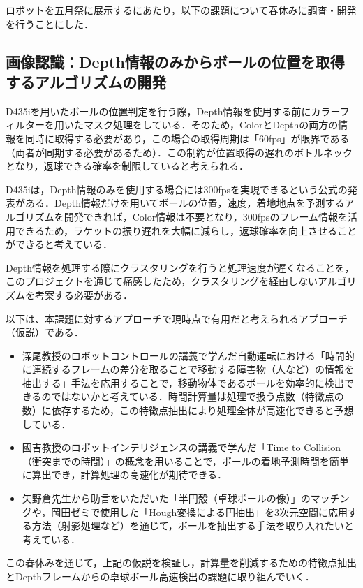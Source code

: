 \documentclass[10pt, oneside, titlepage]{ltjarticle}  %
\begin{document}
  ロボットを五月祭に展示するにあたり，以下の課題について春休みに調査・開発を行うことにした．

  \subsection{画像認識：Depth情報のみからボールの位置を取得するアルゴリズムの開発}
  D435iを用いたボールの位置判定を行う際，Depth情報を使用する前にカラーフィルターを用いたマスク処理をしている．そのため，ColorとDepthの両方の情報を同時に取得する必要があり，この場合の取得周期は「60fps」が限界である（両者が同期する必要があるため）．この制約が位置取得の遅れのボトルネックとなり，返球できる確率を制限していると考えられる．

  D435iは，Depth情報のみを使用する場合には300fpsを実現できるという公式の発表がある\cite{intel}．Depth情報だけを用いてボールの位置，速度，着地地点を予測するアルゴリズムを開発できれば，Color情報は不要となり，300fpsのフレーム情報を活用できるため，ラケットの振り遅れを大幅に減らし，返球確率を向上させることができると考えている．

  Depth情報を処理する際にクラスタリングを行うと処理速度が遅くなることを，このプロジェクトを通じて痛感したため，クラスタリングを経由しないアルゴリズムを考案する必要がある．

  以下は、本課題に対するアプローチで現時点で有用だと考えられるアプローチ（仮説）である．

  \begin{itemize}
    \item 深尾教授のロボットコントロールの講義で学んだ自動運転における「時間的に連続するフレームの差分を取ることで移動する障害物（人など）の情報を抽出する」手法を応用することで，移動物体であるボールを効率的に検出できるのではないかと考えている．時間計算量は処理で扱う点数（特徴点の数）に依存するため，この特徴点抽出により処理全体が高速化できると予想している．

    \item 國吉教授のロボットインテリジェンスの講義で学んだ「Time to Collision（衝突までの時間）」の概念を用いることで，ボールの着地予測時間を簡単に算出でき，計算処理の高速化が期待できる．

    \item 矢野倉先生から助言をいただいた「半円殻（卓球ボールの像）」のマッチングや，岡田ゼミで使用した「Hough変換による円抽出」を3次元空間に応用する方法（射影処理など）を通じて，ボールを抽出する手法を取り入れたいと考えている．
  \end{itemize}

  この春休みを通じて，上記の仮説を検証し，計算量を削減するための特徴点抽出とDepthフレームからの卓球ボール高速検出の課題に取り組んでいく．
\end{document}
